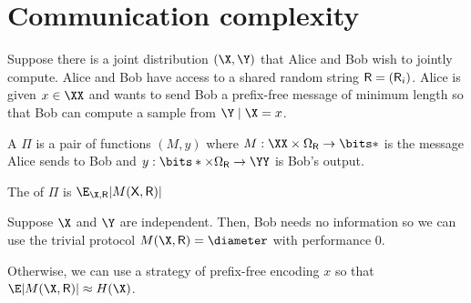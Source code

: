 \documentclass[class=co432,notes,tikz]{agony}
\begin{document}
\section{Communication complexity}
\begin{problem}
  Suppose there is a joint distribution $(\X,\Y)$ that Alice and Bob wish to
  jointly compute. Alice and Bob have access to a shared random string $\mathsf R = (\mathsf R_i)$.
  Alice is given $x\in\XX$ and wants to send Bob a prefix-free message of minimum length
  so that Bob can compute a sample from $\Y \mid \X=x$.
\end{problem}

\begin{defn}
  A  $\Pi$ is a pair of functions $(M,y)$ where
  $M : \XX\times\Omega_{\rv R} \to \bits*$ is the message Alice sends to Bob
  and $y : \bits*\times\Omega_{\rv R} \to \YY$ is Bob's output.

  The  of $\Pi$ is $\E_{\X,\rv R}\abs{M(\rv X,\rv R)}$
\end{defn}

Suppose $\X$ and $\Y$ are independent.
Then, Bob needs no information so we can use the trivial protocol
$M(\X,\rv R) = \varnothing$ with performance 0.

Otherwise, we can use a strategy of prefix-free encoding $x$
so that $\E\abs{M(\X,\rv R)} \approx H(\X)$.
\end{document}
